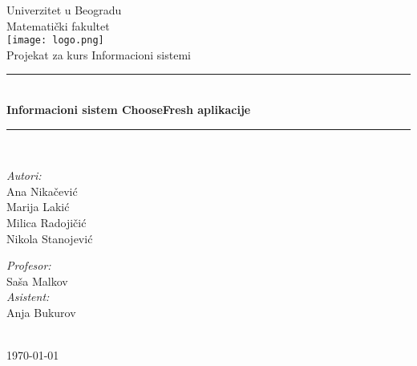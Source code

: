 \begin{titlepage}


\newcommand{\HRule}{\rule{\linewidth}{0.5mm}}
\center
\textup{\Large Univerzitet u Beogradu\\Matemati\v cki fakultet}\\[1.5cm]
\texttt{[image: logo.png]}\\[1cm]

\textup{\Large Projekat za kurs Informacioni sistemi}\\[0.4cm]


\HRule \\[0.4cm]
{ \huge \bfseries Informacioni sistem ChooseFresh aplikacije}\\[0.4cm]
\HRule \\[4.5cm]

\begin{minipage}{0.4\textwidth}
\begin{flushleft}
\large
\emph{Autori:}\\
\textup Ana Nikačević\\
\textup Marija Lakić\\
\textup Milica Radojičić\\
\textup Nikola Stanojević\\

\end{flushleft}
\end{minipage}
\hfill
\begin{minipage}{0.4\textwidth}
\begin{flushright}
\large
\emph{Profesor:} \\
\textup Saša Malkov\\
\emph{Asistent:} \\
\textup Anja Bukurov\\
\end{flushright}
\end{minipage}\\[2cm]

{\textup \large \today}\\[1cm]

\end{titlepage}

